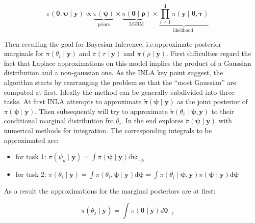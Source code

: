 \documentclass[
  12pt,
  a4paper,
  oneside]{book}
\providecommand{\tightlist}{%
  \setlength{\itemsep}{0pt}\setlength{\parskip}{0pt}}
\theoremstyle{definition}
\theoremstyle{definition}
\theoremstyle{definition}
\theoremstyle{remark}
\begin{document}
\begin{equation}
\pi(\boldsymbol{\theta}, \boldsymbol{\psi} \mid \mathbf{y})\propto  \underbrace{\pi(\boldsymbol{\psi})}_{\text {priors}} \times \underbrace{\pi(\boldsymbol\theta \mid \boldsymbol\rho)}_{\text {LGRM}} \times \underbrace{\prod_{i=1}^{\mathbf{I}} \pi\left(\mathbf{y} \mid \boldsymbol\theta, \boldsymbol{\tau}\right)}_{\text {likelihood }}
\label{eq:poissonlgm}
\end{equation}

Then recalling the goal for Bayesian Inference, i.e.approximate posterior marginals for \(\pi\left(\theta_{i} \mid \mathbf{y}\right)\) and \(\pi\left(\tau \mid \boldsymbol{\mathbf{y}}\right)\) and \(\pi\left(\rho \mid \boldsymbol{\mathbf{y}}\right)\). First difficulties regard the fact that Laplace approximations on this model implies the product of a Gaussian distribution and a non-gaussian one. As the INLA key point suggest, the algorithm starts by rearranging the problem so that the ``most Gaussian'' are computed at first.
Ideally the method can be generally subdivided into three tasks. At first INLA attempts to approximate \(\tilde{\pi}(\boldsymbol{\psi} \mid \boldsymbol{\mathbf{y}})\) as the joint posterior of \({\pi}(\boldsymbol{\psi} \mid \boldsymbol{\mathbf{y}})\). Then subsequently will try to approximate \(\tilde{\pi}\left(\theta_{i} \mid \boldsymbol\psi, \mathbf{y}\right)\) to their conditional marginal distribution fro \(\theta_i\). In the end explores \(\tilde{\pi}(\boldsymbol{\psi} \mid \boldsymbol{\mathbf{y}})\) with numerical methods for integration.
The corresponding integrals to be approximated are:

\begin{itemize}
\tightlist
\item
  for task 1: \(\pi\left(\psi_{k} \mid \boldsymbol{\mathbf{y}}\right)=\int \pi(\boldsymbol{\psi} \mid \boldsymbol{\mathbf{y}}) \mathrm{d} \boldsymbol{\psi}_{-k}\)
\item
  for task 2: \(\pi\left(\theta_{i} \mid \boldsymbol{\mathbf{y}}\right)=\int \pi\left(\theta_{i}, \boldsymbol{\psi} \mid \boldsymbol{\mathbf{y}}\right) \mathrm{d} \boldsymbol{\psi}=\int \pi\left(\theta_{i} \mid \boldsymbol{\psi}, \boldsymbol{\mathbf{y}}\right) \pi(\boldsymbol{\psi} \mid \boldsymbol{\mathbf{y}}) \mathrm{d} \boldsymbol{\psi}\)
\end{itemize}

As a result the approximations for the marginal posteriors are at first:

\begin{equation}
\tilde{\pi}\left(\theta_{j} \mid \boldsymbol{\mathbf{y}}\right)=\int \tilde{\pi}(\boldsymbol{\theta} \mid \boldsymbol{\mathbf{y}}) d \boldsymbol{\theta}_{-j}
\label{eq:postapproxprior}
\end{equation}
\end{document}
